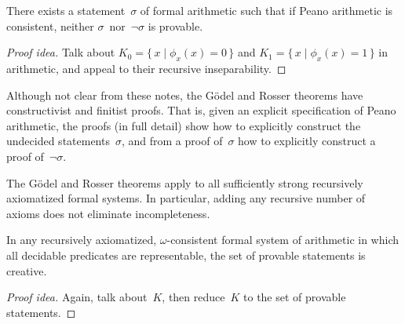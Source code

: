 \begin{thm}
There exists a statement~\(\sigma\) of formal arithmetic such that if Peano arithmetic is consistent, neither \(\sigma\)~nor~\(\lnot\sigma\) is provable.
\end{thm}
\begin{proof}[Proof idea]
Talk about \(K_0=\{\,x\mid\phi_x(x)=0\,\}\) and \(K_1=\{\,x\mid\phi_x(x)=1\,\}\) in arithmetic, and appeal to their recursive inseparability.
\end{proof}

\begin{rmk}
Although not clear from these notes, the G\"odel and Rosser theorems have constructivist and finitist proofs. That is, given an explicit specification of Peano arithmetic, the proofs (in full detail) show how to explicitly construct the undecided statements~\(\sigma\), and from a proof of~\(\sigma\) how to explicitly construct a proof of~\(\lnot\sigma\).
\end{rmk}
\begin{rmk}
The G\"odel and Rosser theorems apply to all sufficiently strong recursively axiomatized formal systems. In particular, adding any recursive number of axioms does not eliminate incompleteness.
\end{rmk}

\begin{thm}
In any recursively axiomatized, \(\omega\)-consistent formal system of arithmetic in which all decidable predicates are representable, the set of provable statements is creative.
\end{thm}
\begin{proof}[Proof idea]
Again, talk about~\(K\), then reduce~\(K\) to the set of provable statements.
\end{proof}
